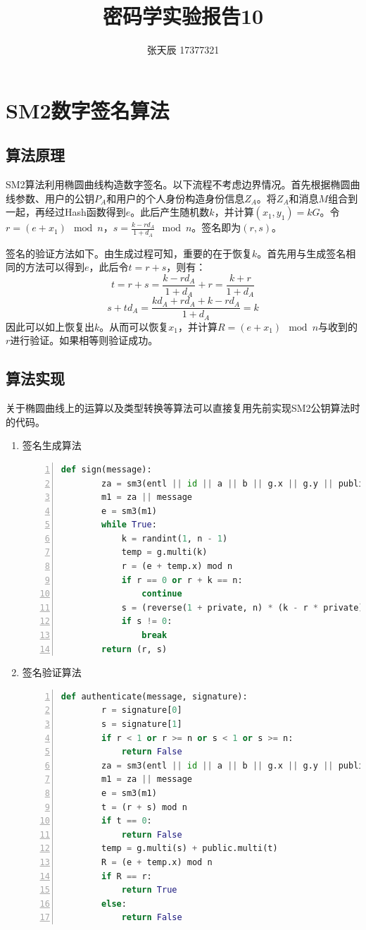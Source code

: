 \documentclass[11pt]{ctexart}
\title{密码学实验报告10}
\author{张天辰 17377321}
\begin{document}
\maketitle{}
\section{SM2数字签名算法} %
\subsection{算法原理} %
SM2算法利用椭圆曲线构造数字签名。以下流程不考虑边界情况。首先根据椭圆曲线参数、用户的公钥$P_A$和用户的个人身份构造身份信息$Z_A$。将$Z_A$和消息$M$组合到一起，再经过Hash函数得到$e$。此后产生随机数$k$，并计算$(x_1, y_1) = kG$。令$r = (e + x_1) \mod n$，$s = \frac{k - rd_A}{1 + d_A} \mod n$。签名即为$(r, s)$。

签名的验证方法如下。由生成过程可知，重要的在于恢复$k$。首先用与生成签名相同的方法可以得到$e$，此后令$t = r + s$，则有：
$$t = r + s = \frac{k - rd_A}{1 + d_A} + r = \frac{k + r}{1 + d_A}$$
$$s + td_A = \frac{kd_A + rd_A + k - rd_A}{1 + d_A} = k$$
因此可以如上恢复出$k$。从而可以恢复$x_1$，并计算$R = (e + x_1) \mod n$与收到的$r$进行验证。如果相等则验证成功。
\subsection{算法实现} %
关于椭圆曲线上的运算以及类型转换等算法可以直接复用先前实现SM2公钥算法时的代码。
\begin{enumerate}
    \item 签名生成算法
    \begin{lstlisting}[language={python},
    numbers=left,
    numberstyle=\tiny\monaco,
    basicstyle=\small\monaco]
    def sign(message):
        za = sm3(entl || id || a || b || g.x || g.y || public.x || public.y)
        m1 = za || message
        e = sm3(m1)
        while True:
            k = randint(1, n - 1)
            temp = g.multi(k)
            r = (e + temp.x) mod n
            if r == 0 or r + k == n:
                continue
            s = (reverse(1 + private, n) * (k - r * private)) mod n
            if s != 0:
                break
        return (r, s)
    \end{lstlisting}
    \item 签名验证算法
    \begin{lstlisting}[language={python},
    numbers=left,
    numberstyle=\tiny\monaco,
    basicstyle=\small\monaco]
    def authenticate(message, signature):
        r = signature[0]
        s = signature[1]
        if r < 1 or r >= n or s < 1 or s >= n:
            return False
        za = sm3(entl || id || a || b || g.x || g.y || public.x || public.y)
        m1 = za || message
        e = sm3(m1)
        t = (r + s) mod n
        if t == 0:
            return False
        temp = g.multi(s) + public.multi(t)
        R = (e + temp.x) mod n
        if R == r:
            return True
        else:
            return False
    \end{lstlisting}
\end{enumerate}
\end{document}
